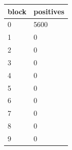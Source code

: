 \begin{tabular}{ll}
\toprule
block & positives \\
\midrule
0 & 5600 \\
1 & 0 \\
2 & 0 \\
3 & 0 \\
4 & 0 \\
5 & 0 \\
6 & 0 \\
7 & 0 \\
8 & 0 \\
9 & 0 \\
\bottomrule
\end{tabular}
